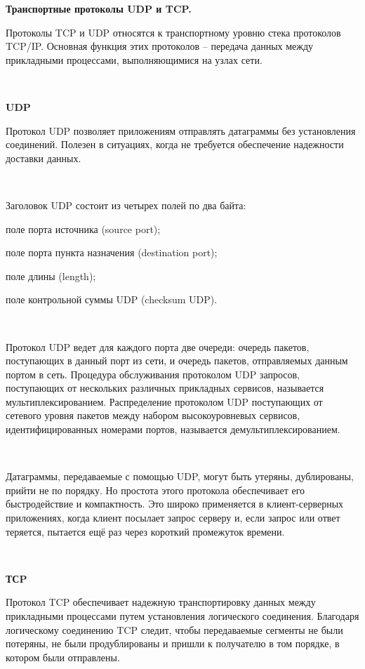 \documentclass{article}
\begin{document}
\newpage

\textbf{\large Транспортные протоколы UDP и TCP.}

Протоколы TCP и UDP относятся к транспортному уровню стека протоколов TCP/IP.
Основная функция этих протоколов – передача данных между прикладными
процессами, выполняющимися на узлах сети.

~\

\textbf{UDP}

Протокол UDP позволяет приложениям отправлять датаграммы без установления соединений. 
Полезен в ситуациях, когда не требуется обеспечение надежности доставки данных. 

~\

Заголовок UDP состоит из четырех полей по два байта:
\begin{compactitem}
\item  поле порта источника (source port);
\item поле порта пункта назначения (destination port);
\item поле длины (length);
\item поле контрольной суммы UDP (checksum UDP).
\end{compactitem}

~\

Протокол UDP ведет для каждого порта две очереди: очередь пакетов, поступающих в данный порт из сети, и очередь пакетов, отправляемых данным портом в сеть. 
Процедура обслуживания протоколом UDP запросов, поступающих от нескольких различных прикладных сервисов, называется мультиплексированием. 
Распределение протоколом UDP поступающих от сетевого уровня пакетов между набором высокоуровневых сервисов, идентифицированных номерами портов, называется демультиплексированием.

~\

Датаграммы, передаваемые с помощью UDP, могут быть утеряны, дублированы, прийти не по порядку. Но простота этого протокола обеспечивает его быстродействие и компактность.
Это широко применяется в клиент-серверных приложениях, когда клиент посылает запрос серверу и, если запрос или ответ теряется, пытается ещё раз через короткий промежуток времени.

~\

\textbf{ТСP}

Протокол TCP обеспечивает надежную транспортировку данных между прикладными процессами путем установления логического соединения.
 Благодаря логическому соединению TCP следит, чтобы передаваемые сегменты не были потеряны, не были продублированы и пришли к получателю в том порядке, в котором были отправлены.
\end{document}
